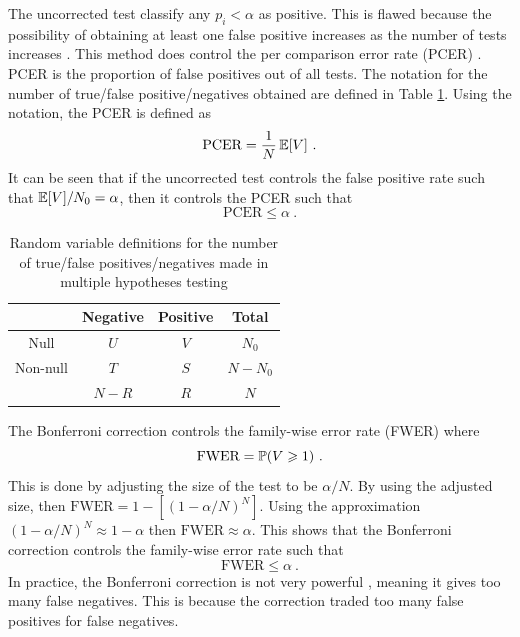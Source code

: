 The uncorrected test classify any $p_i<\alpha$ as positive. This is flawed because the possibility of obtaining at least one false positive increases as the number of tests increases \citep{shaffer1995multiple}. This method does control the per comparison error rate (PCER) \citep{benjamini1995controlling}. PCER is the proportion of false positives out of all tests. The notation for the number of true/false positive/negatives obtained are defined in Table \ref{table:inference_randomvariables}. Using the notation, the PCER is defined as
\begin{equation}
  \text{PCER}=
  \dfrac{1}{N}
  \operatorname{\mathbb{E}}[V]
  \ .
\end{equation}
It can be seen that if the uncorrected test controls the false positive rate such that $\operatorname{\mathbb{E}}[V]/N_0 = \alpha$, then it controls the PCER such that
\begin{equation}
  \text{PCER}\leqslant\alpha \ .
\end{equation}

\begin{table}
  \centering
  \begin{tabular}{c|c|c|c}
    &Negative&Positive&Total\\\hline
    Null & $U$ & $V$ & $N_0$\\
    Non-null & $T$ & $S$ & $N-N_0$\\\hline
    &$N-R$&$R$&$N$
  \end{tabular}
  \caption{Random variable definitions for the number of true/false positives/negatives made in multiple hypotheses testing}
  \label{table:inference_randomvariables}
\end{table} 

The Bonferroni correction \citep{shaffer1995multiple, bland1995multiple, perneger1998what} controls the family-wise error rate (FWER) \citep{shaffer1995multiple} where
\begin{equation}
  \text{FWER} = \operatorname{\mathbb{P}}(V\geqslant1) \ .
  \label{eq:inference_fwer}
\end{equation}
This is done by adjusting the size of the test to be $\alpha/N$. By using the adjusted size, then $\text{FWER}=1-\left[(1-\alpha/N)^N\right]$. Using the approximation $(1-\alpha/N)^N\approx 1-\alpha$ then $\text{FWER}\approx \alpha$. This shows that the Bonferroni correction controls the family-wise error rate such that
\begin{equation}
  \text{FWER} \leqslant \alpha \ .
\end{equation}
In practice, the Bonferroni correction is not very powerful \citep{perneger1998what}, meaning it gives too many false negatives. This is because the correction traded too many false positives for false negatives.

